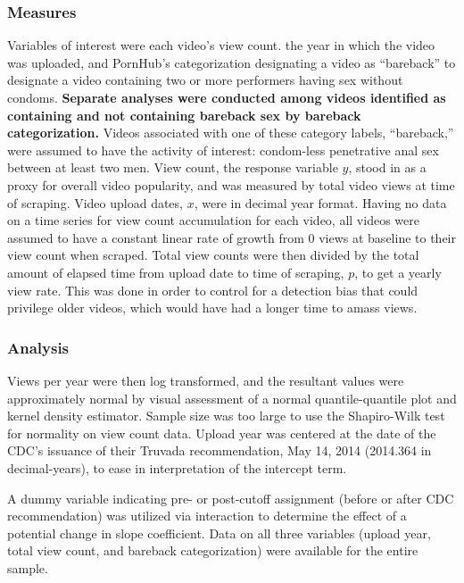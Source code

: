 \documentclass[]{article}
\begin{document}
\subsubsection{Measures}\label{measures}

Variables of interest were each video's view count. the year in which
the video was uploaded, and PornHub's categorization designating a video
as ``bareback'' to designate a video containing two or more performers
having sex without condoms. \textbf{Separate analyses were conducted
among videos identified as containing and not containing bareback sex by
bareback categorization.} Videos associated with one of these category
labels, ``bareback,'' were assumed to have the activity of interest:
condom-less penetrative anal sex between at least two men. View count,
the response variable \(y\), stood in as a proxy for overall video
popularity, and was measured by total video views at time of scraping.
Video upload dates, \(x\), were in decimal year format. Having no data
on a time series for view count accumulation for each video, all videos
were assumed to have a constant linear rate of growth from 0 views at
baseline to their view count when scraped. Total view counts were then
divided by the total amount of elapsed time from upload date to time of
scraping, \(p\), to get a yearly view rate. This was done in order to
control for a detection bias that could privilege older videos, which
would have had a longer time to amass views.

\subsubsection{Analysis}\label{analysis}

Views per year were then log transformed, and the resultant values were
approximately normal by visual assessment of a normal quantile-quantile
plot and kernel density estimator. Sample size was too large to use the
Shapiro-Wilk test for normality on view count data. Upload year was
centered at the date of the CDC's issuance of their Truvada
recommendation, May 14, 2014 (2014.364 in decimal-years), to ease in
interpretation of the intercept term.

A dummy variable indicating pre- or post-cutoff assignment (before or
after CDC recommendation) was utilized via interaction to determine the
effect of a potential change in slope coefficient. Data on all three
variables (upload year, total view count, and bareback categorization)
were available for the entire sample.
\end{document}

